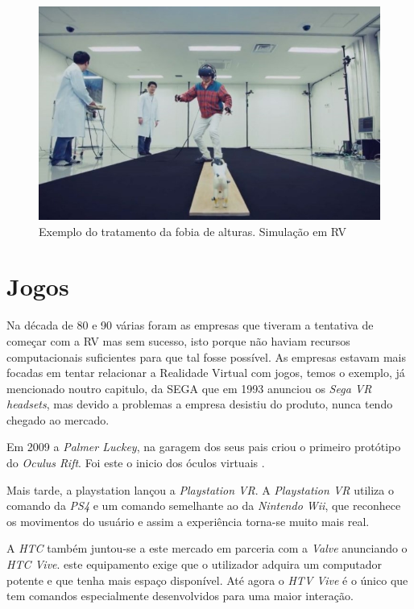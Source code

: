 \begin{figure}[h]
\center
\includegraphics[scale=0.4]{imagens/RV_tratamento_fobia.jpg}
\caption{Exemplo do tratamento da fobia de alturas. Simulação em RV \cite{RV_fobia_1}}
\end{figure}

\section{Jogos}
Na década de 80 e 90 várias foram as empresas que tiveram a tentativa de começar com a \acl{RV} mas sem sucesso, isto porque não haviam recursos computacionais suficientes para que tal fosse possível. As empresas estavam mais focadas em tentar relacionar a Realidade Virtual com jogos, temos o exemplo, já mencionado noutro capitulo, da SEGA que em 1993 anunciou os \emph{Sega VR headsets}, mas devido a problemas a empresa desistiu do produto, nunca tendo chegado ao mercado.

Em 2009 a \emph{Palmer Luckey}, na garagem dos seus pais criou o primeiro protótipo do \emph{Oculus Rift}. Foi este o inicio dos óculos virtuais \cite{RV_fundador}.

Mais tarde, a playstation lançou a \emph{Playstation VR}. A \emph{Playstation VR} utiliza o comando da \emph{PS4} e um comando semelhante ao da \emph{Nintendo Wii}, que reconhece os movimentos do usuário e assim a experiência torna-se muito mais real.

A \emph{HTC} também juntou-se a este mercado em parceria com a \emph{Valve} anunciando o \emph{HTC Vive}.
este equipamento exige que o utilizador adquira um computador potente e que tenha mais espaço disponível. Até agora o \emph{HTV Vive} é o único que tem comandos especialmente desenvolvidos para uma maior interação.


